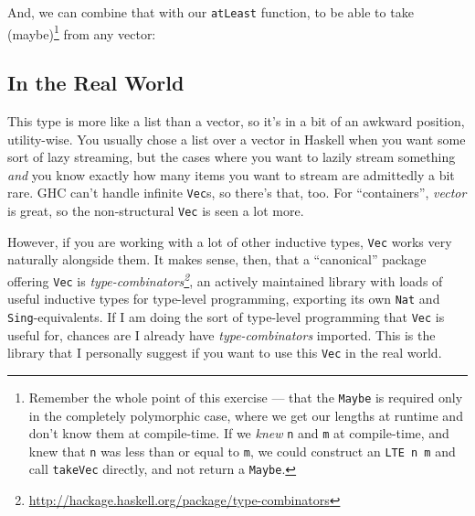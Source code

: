 \documentclass[]{article}
\newenvironment{Shaded}{}{}
\newcommand{\CommentTok}[1]{\textcolor[rgb]{0.38,0.63,0.69}{\textit{#1}}}
\newcommand{\DataTypeTok}[1]{\textcolor[rgb]{0.56,0.13,0.00}{#1}}
\newcommand{\FunctionTok}[1]{\textcolor[rgb]{0.02,0.16,0.49}{#1}}
\newcommand{\NormalTok}[1]{#1}
\newcommand{\OperatorTok}[1]{\textcolor[rgb]{0.40,0.40,0.40}{#1}}
\newcommand{\OtherTok}[1]{\textcolor[rgb]{0.00,0.44,0.13}{#1}}
\renewcommand{\href}[2]{#2\footnote{\url{#1}}}
\begin{document}
And, we can combine that with our \texttt{atLeast} function, to be able to take
(maybe)\footnote{Remember the whole point of this exercise --- that the
  \texttt{Maybe} is required only in the completely polymorphic case, where we
  get our lengths at runtime and don't know them at compile-time. If we
  \emph{knew} \texttt{n} and \texttt{m} at compile-time, and knew that
  \texttt{n} was less than or equal to \texttt{m}, we could construct an
  \texttt{LTE\ n\ m} and call \texttt{takeVec} directly, and not return a
  \texttt{Maybe}.} from any vector:

\begin{Shaded}
\end{Shaded}

\hypertarget{in-the-real-world}{%
\subsection{In the Real World}\label{in-the-real-world}}

This type is more like a list than a vector, so it's in a bit of an awkward
position, utility-wise. You usually chose a list over a vector in Haskell when
you want some sort of lazy streaming, but the cases where you want to lazily
stream something \emph{and} you know exactly how many items you want to stream
are admittedly a bit rare. GHC can't handle infinite \texttt{Vec}s, so there's
that, too. For ``containers'', \emph{vector} is great, so the non-structural
\texttt{Vec} is seen a lot more.

However, if you are working with a lot of other inductive types, \texttt{Vec}
works very naturally alongside them. It makes sense, then, that a ``canonical''
package offering \texttt{Vec} is
\emph{\href{http://hackage.haskell.org/package/type-combinators}{type-combinators}},
an actively maintained library with loads of useful inductive types for
type-level programming, exporting its own \texttt{Nat} and
\texttt{Sing}-equivalents. If I am doing the sort of type-level programming that
\texttt{Vec} is useful for, chances are I already have \emph{type-combinators}
imported. This is the library that I personally suggest if you want to use this
\texttt{Vec} in the real world.
\end{document}
